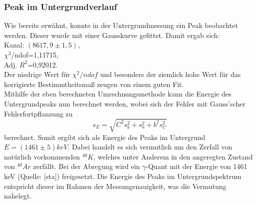   \subsubsection{Peak im Untergrundverlauf}
  Wie bereits erwähnt, konnte in der Untergrundmessung ein Peak beobachtet werden. Dieser wurde mit einer Gausskurve gefittet. Damit ergab sich:\\
  Kanal: $(8617,9\pm1,5)$,\\
  $\chi^{2}$/ndof=1,11715,\\
  Adj. $R^{2}$=0,92012.\\
  Der niedrige Wert für $\chi^{2}/ndof$ und besonders der ziemlich hohe Wert für das korrigierte Bestimmtheitsmaß zeugen von einem guten Fit. \\
  Mithilfe der eben berechneten Umrechnungsmethode kann die Energie des Untergrundpeaks nun berechnet werden, wobei sich der Fehler mit Gauss'scher Fehlerfortpflanzung zu 
  \[s_{E}=\sqrt{C^{2}s_{b}^{2}+s_{a}^{2}+b^{2}s_{C}^{2}}\] 
  berechnet. Somit ergibt sich als Energie des Peaks im Untergrund $E=(1461\pm5)keV$. Dabei handelt es sich vermutlich um den Zerfall von natürlich vorkommenden $^{40}K$, welches unter Anderem in den angeregten Zustand von $^{40}Ar$ zerfällt. Bei der Abregung wird ein $\gamma$-Quant mit der Energie von 1461 keV (Quelle: [sta]) freigesetzt. Die Energie des Peaks im Untergrundspektrum entspricht dieser im Rahmen der Messungenauigkeit, was die Vermutung nahelegt. 
  \clearpage
